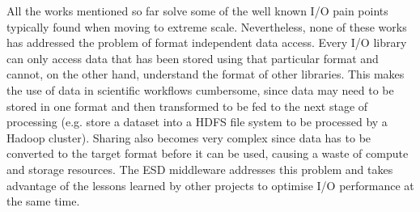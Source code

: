 \documentclass{../../template/esiwace-report}
\begin{document}
All the works mentioned so far solve some of the well known I/O pain points typically found when moving to extreme scale. Nevertheless, none of these works has addressed the problem of format independent data access. Every I/O library can only access data that has been stored using that particular format and cannot, on the other hand, understand the format of other libraries. This makes the use of data in scientific workflows cumbersome, since data may need to be stored in one format and then transformed to be fed to the next stage of processing (e.g. store a dataset into a HDFS file system to be processed by a Hadoop cluster). Sharing also becomes very complex since data has to be converted to the target format before it can be used, causing a waste of compute and storage resources. The ESD middleware addresses this problem and takes advantage of the lessons learned by other projects to optimise I/O performance at the same time.
\end{document}
